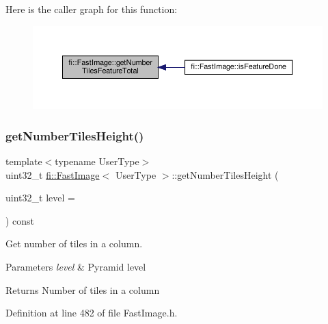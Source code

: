 Here is the caller graph for this function\+:
\nopagebreak
\begin{figure}[H]
\begin{center}
\leavevmode
\includegraphics[width=350pt]{dc/d6b/classfi_1_1FastImage_a37f70f57589775492c72a43b23ab0872_icgraph}
\end{center}
\end{figure}
\mbox{\label{classfi_1_1FastImage_a84984ae1d928ef604866f126ed0a583b}} 
\subsubsection{\texorpdfstring{get\+Number\+Tiles\+Height()}{getNumberTilesHeight()}}
{\footnotesize\ttfamily template$<$typename User\+Type$>$ \\
uint32\+\_\+t \hyperlink{classfi_1_1FastImage}{fi\+::\+Fast\+Image}$<$ User\+Type $>$\+::get\+Number\+Tiles\+Height (\begin{DoxyParamCaption}\item[{uint32\+\_\+t}]{level = {} }\end{DoxyParamCaption}) const\hspace{0.3cm}{\ttfamily [inline]}}



Get number of tiles in a column. 


\begin{DoxyParams}{Parameters}
{\em level} & Pyramid level \\
\hline
\end{DoxyParams}
\begin{DoxyReturn}{Returns}
Number of tiles in a column 
\end{DoxyReturn}


Definition at line 482 of file Fast\+Image.\+h.

